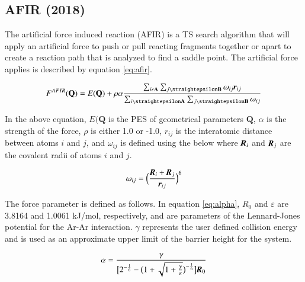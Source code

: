 \documentclass[preprint, 11pt]{elsarticle} %
\begin{document}
\subsection{AFIR (2018)}

The artificial force induced reaction (AFIR) is a TS search algorithm that will apply an artificial force to push or pull reacting fragments together or apart to create a reaction path that is analyzed to find a saddle point.
The artificial force applies is described by equation \ref{eq:afir}.

\begin{equation}
    F^{AFIR}(\textbf{Q}) = E(\textbf{Q}) + \rho\alpha \frac{\sum_{i\epsilon\textbf{A}} \sum_{j\straightepsilon\textbf{B}} \omega_{ij}\textbf{\textit{r}}_{ij}}{\sum_{i\straightepsilon\textbf{A}} \sum_{j\straightepsilon\textbf{B}} \omega_{ij}}
    \label{eq:afir}
\end{equation}

In the above equation, $E(\textbf{Q}$ is the PES of geometrical parameters $\textbf{Q}$, $\alpha$ is the strength of the force, $\rho$ is either 1.0 or -1.0, $r_{ij}$ is the interatomic distance between atoms $i$ and $j$, and $\omega_{ij}$ is defined using the below where $\textbf{\textit{R}}_i$ and $\textbf{\textit{R}}_j$ are the covalent radii of atoms $i$ and $j$.

\begin{equation}
    \omega_{ij} = \Big( \frac{\textbf{\textit{R}}_i + \textbf{\textit{R}}_j}{\textbf{\textit{r}}_{ij}} \Big)^6
\end{equation}

The force parameter is defined as follows.
In equation \ref{eq:alpha}, $\textit{R}_0$ and $\varepsilon$ are 3.8164 \angstrom and 1.0061 kJ/mol, respectively, and are parameters of the Lennard-Jones potential for the Ar-Ar interaction.
$\gamma$ represents the user defined collision energy and is used as an approximate upper limit of the barrier height for the system. 

\begin{equation}
    \alpha = \frac{\gamma}{\big[2^{-\frac{1}{6}} - \big( 1+ \sqrt{1+ \frac{\gamma}{\varepsilon }} \big)^{-\frac{1}{6}} \big] \textbf{\textit{R}}_0}
    \label{eq:alpha}
\end{equation}
\end{document}
